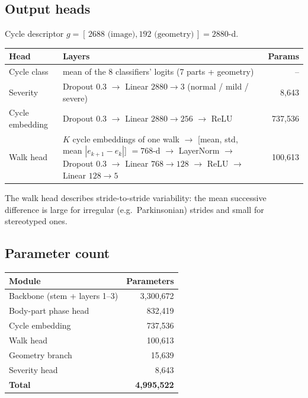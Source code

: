 \documentclass[10pt,a4paper]{article}
\begin{document}
\subsection{Output heads}
Cycle descriptor $g = [\,2688 \text{ (image)}, 192 \text{ (geometry)}\,] = 2880$-d.
\begin{center}
\begin{tabularx}{\textwidth}{@{}lLr@{}}
\toprule
Head & Layers & Params \\
\midrule
Cycle class & mean of the 8 classifiers' logits (7 parts + geometry) & -- \\
Severity & Dropout 0.3 $\to$ Linear $2880\to3$ (normal / mild / severe) & 8{,}643 \\
Cycle embedding & Dropout 0.3 $\to$ Linear $2880\to256$ $\to$ ReLU & 737{,}536 \\
Walk head & $K$ cycle embeddings of one walk $\to$ [mean, std, mean $|e_{k+1}-e_k|$] $= 768$-d
  $\to$ LayerNorm $\to$ Dropout 0.3 $\to$ Linear $768\to128$ $\to$ ReLU $\to$ Linear $128\to5$ & 100{,}613 \\
\bottomrule
\end{tabularx}
\end{center}
The walk head describes stride-to-stride variability: the mean successive difference is
large for irregular (e.g.\ Parkinsonian) strides and small for stereotyped ones.

\subsection{Parameter count}
\begin{center}
\begin{tabular}{@{}lr@{}}
\toprule
Module & Parameters \\
\midrule
Backbone (stem + layers 1--3) & 3{,}300{,}672 \\
Body-part phase head & 832{,}419 \\
Cycle embedding & 737{,}536 \\
Walk head & 100{,}613 \\
Geometry branch & 15{,}639 \\
Severity head & 8{,}643 \\
\midrule
\textbf{Total} & \textbf{4{,}995{,}522} \\
\bottomrule
\end{tabular}
\end{center}
\end{document}
